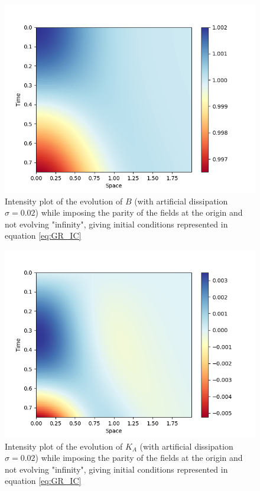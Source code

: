 \begin{figure}[t!]
    \centering
    \includegraphics[width=\columnwidth]{Images/adm_evolution-2nd_order-B.png}
    \caption{Intensity plot of the evolution of $B$ (with artificial dissipation $\sigma = 0.02$) while imposing the parity of the fields at the origin and not evolving "infinity", giving initial conditions represented in equation \eqref{eq:GR_IC}}
    \label{fig:B}
\end{figure}

\begin{figure}[t!]
    \centering
    \includegraphics[width=\columnwidth]{Images/adm_evolution-2nd_order-KA.png}
    \caption{Intensity plot of the evolution of $K_A$ (with artificial dissipation $\sigma = 0.02$) while imposing the parity of the fields at the origin and not evolving "infinity", giving initial conditions represented in equation \eqref{eq:GR_IC}}
    \label{fig:KA}
\end{figure}

